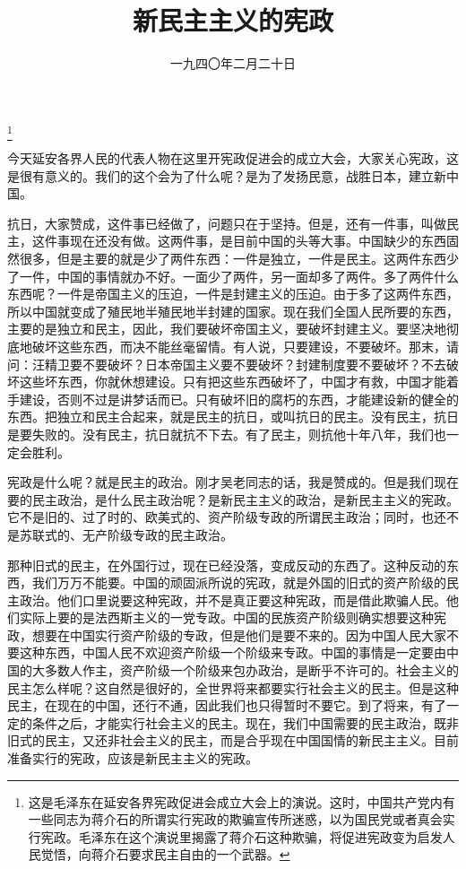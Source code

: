 
\title{新民主主义的宪政}
\date{一九四〇年二月二十日}
\thanks{这是毛泽东在延安各界宪政促进会成立大会上的演说。这时，中国共产党内有一些同志为蒋介石的所谓实行宪政的欺骗宣传所迷惑，以为国民党或者真会实行宪政。毛泽东在这个演说里揭露了蒋介石这种欺骗，将促进宪政变为启发人民觉悟，向蒋介石要求民主自由的一个武器。}
\maketitle


今天延安各界人民的代表人物在这里开宪政促进会的成立大会，大家关心宪政，这是很有意义的。我们的这个会为了什么呢？是为了发扬民意，战胜日本，建立新中国。

抗日，大家赞成，这件事已经做了，问题只在于坚持。但是，还有一件事，叫做民主，这件事现在还没有做。这两件事，是目前中国的头等大事。中国缺少的东西固然很多，但是主要的就是少了两件东西：一件是独立，一件是民主。这两件东西少了一件，中国的事情就办不好。一面少了两件，另一面却多了两件。多了两件什么东西呢？一件是帝国主义的压迫，一件是封建主义的压迫。由于多了这两件东西，所以中国就变成了殖民地半殖民地半封建的国家。现在我们全国人民所要的东西，主要的是独立和民主，因此，我们要破坏帝国主义，要破坏封建主义。要坚决地彻底地破坏这些东西，而决不能丝毫留情。有人说，只要建设，不要破坏。那末，请问：汪精卫要不要破坏？日本帝国主义要不要破坏？封建制度要不要破坏？不去破坏这些坏东西，你就休想建设。只有把这些东西破坏了，中国才有救，中国才能着手建设，否则不过是讲梦话而已。只有破坏旧的腐朽的东西，才能建设新的健全的东西。把独立和民主合起来，就是民主的抗日，或叫抗日的民主。没有民主，抗日是要失败的。没有民主，抗日就抗不下去。有了民主，则抗他十年八年，我们也一定会胜利。

宪政是什么呢？就是民主的政治。刚才吴老同志的话，我是赞成的。但是我们现在要的民主政治，是什么民主政治呢？是新民主主义的政治，是新民主主义的宪政。它不是旧的、过了时的、欧美式的、资产阶级专政的所谓民主政治；同时，也还不是苏联式的、无产阶级专政的民主政治。

那种旧式的民主，在外国行过，现在已经没落，变成反动的东西了。这种反动的东西，我们万万不能要。中国的顽固派所说的宪政，就是外国的旧式的资产阶级的民主政治。他们口里说要这种宪政，并不是真正要这种宪政，而是借此欺骗人民。他们实际上要的是法西斯主义的一党专政。中国的民族资产阶级则确实想要这种宪政，想要在中国实行资产阶级的专政，但是他们是要不来的。因为中国人民大家不要这种东西，中国人民不欢迎资产阶级一个阶级来专政。中国的事情是一定要由中国的大多数人作主，资产阶级一个阶级来包办政治，是断乎不许可的。社会主义的民主怎么样呢？这自然是很好的，全世界将来都要实行社会主义的民主。但是这种民主，在现在的中国，还行不通，因此我们也只得暂时不要它。到了将来，有了一定的条件之后，才能实行社会主义的民主。现在，我们中国需要的民主政治，既非旧式的民主，又还非社会主义的民主，而是合乎现在中国国情的新民主主义。目前准备实行的宪政，应该是新民主主义的宪政。

